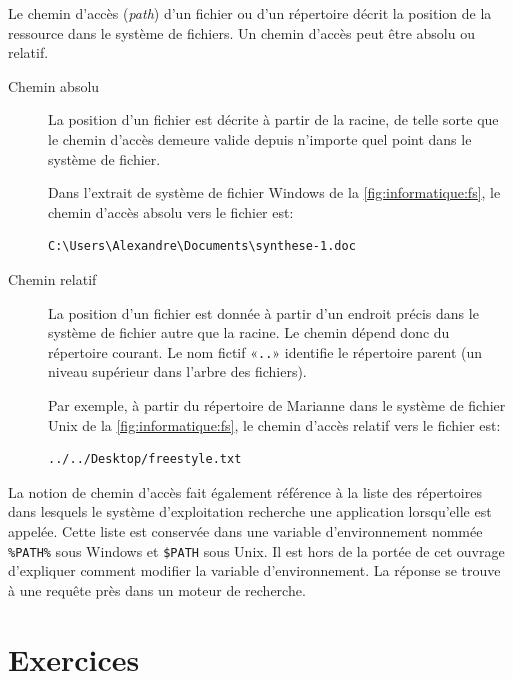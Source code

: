 Le chemin d'accès (\emph{path}) d'un fichier ou
d'un répertoire décrit la position de la ressource dans le système de
fichiers. Un chemin d'accès peut être absolu ou relatif.
\begin{description}
\item[Chemin absolu]  La position d'un
  fichier est décrite à partir de la racine, de telle sorte que le
  chemin d'accès demeure valide depuis n'importe quel point dans le
  système de fichier.

  Dans l'extrait de système de fichier Windows de la
  \autoref{fig:informatique:fs}, le chemin d'accès absolu vers le
  fichier  est:
\begin{Schunk}
\begin{Verbatim}
C:\Users\Alexandre\Documents\synthese-1.doc
\end{Verbatim}
\end{Schunk}
\item[Chemin relatif]  La position d'un
  fichier est donnée à partir d'un endroit précis dans le système de
  fichier autre que la racine. Le chemin dépend donc du répertoire
  courant. Le nom fictif «\verb=..=» identifie le répertoire parent
  (un niveau supérieur dans l'arbre des fichiers).

  Par exemple, à partir du répertoire  de
  Marianne dans le système de fichier Unix de la
  \autoref{fig:informatique:fs}, le chemin d'accès relatif vers le
  fichier  est:
\begin{Schunk}
\begin{Verbatim}
../../Desktop/freestyle.txt
\end{Verbatim}
\end{Schunk}
\end{description}

La notion de chemin d'accès fait également référence à la liste des
répertoires dans lesquels le système d'exploitation recherche une
application lorsqu'elle est appelée. Cette liste est conservée dans
une variable d'environnement nommée \verb=%PATH%= sous
Windows
et
\verb=$PATH= sous Unix. Il est hors de la portée de cet
ouvrage d'expliquer comment modifier la variable d'environnement. La
réponse se trouve à une requête près dans un moteur de recherche.


\section{Exercices}
\label{operateurs:exercices}

